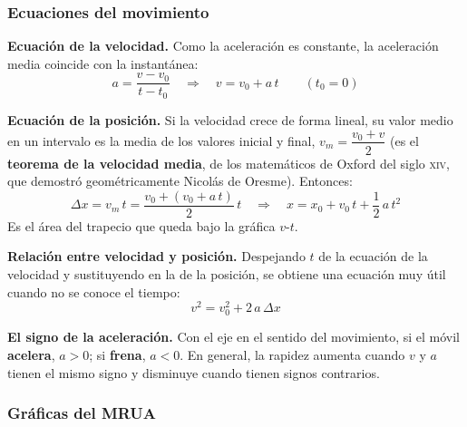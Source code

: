 \subsubsection{Ecuaciones del movimiento}

\textbf{Ecuación de la velocidad.} Como la aceleración es constante, la aceleración media coincide con la instantánea:
\[ a = \frac{v - v_0}{t - t_0} \quad\Rightarrow\quad \boxed{v = v_0 + a\,t} \qquad (t_0 = 0) \]

\textbf{Ecuación de la posición.} Si la velocidad crece de forma lineal, su valor medio en un intervalo es la media de los valores
inicial y final, \(v_m = \dfrac{v_0 + v}{2}\) (es el \textbf{teorema de la velocidad media}, de los matemáticos de Oxford del
siglo \textsc{xiv}, que demostró geométricamente Nicolás de Oresme). Entonces:
\[ \Delta x = v_m\,t = \frac{v_0 + (v_0 + a\,t)}{2}\,t \quad\Rightarrow\quad \boxed{x = x_0 + v_0\,t + \frac{1}{2}\,a\,t^2} \]
Es el área del trapecio que queda bajo la gráfica \(v\)-\(t\).

\textbf{Relación entre velocidad y posición.} Despejando \(t\) de la ecuación de la velocidad y sustituyendo en la de la posición,
se obtiene una ecuación muy útil cuando no se conoce el tiempo:
\[ \boxed{v^2 = v_0^2 + 2\,a\,\Delta x} \]

\begin{remark}
    \textbf{El signo de la aceleración.} Con el eje en el sentido del movimiento, si el móvil \textbf{acelera}, \(a > 0\); si
    \textbf{frena}, \(a < 0\). En general, la rapidez aumenta cuando \(v\) y \(a\) tienen el mismo signo y disminuye cuando tienen
    signos contrarios.
\end{remark}

\subsubsection{Gráficas del MRUA}

